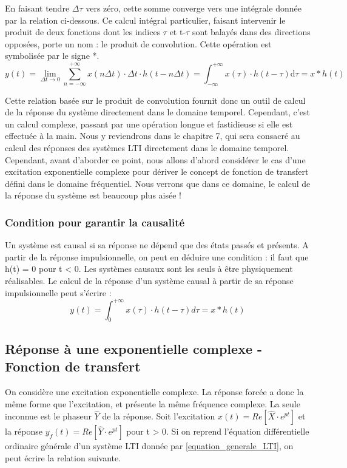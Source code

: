 \documentclass[]{report}
\newcommand{\deriv}{\mathrm{d}}
\begin{document}
	En faisant tendre $ \Delta \tau $ vers zéro, cette somme converge vers une intégrale
	donnée par la relation ci-dessous. Ce calcul intégral particulier,
	faisant intervenir le produit de deux fonctions dont les indices $\tau $ et
	t-$\tau $ sont balayés dans des directions opposées, porte un nom : le produit
	de convolution. Cette opération est symbolisée par le signe *.
	\begin{equation}\label{Demo_produit_convolution}
	y(t) = \lim_{\Delta t \to 0} \sum_{n=-\infty}^{+\infty} x(n\Delta t) \cdot \Delta t \cdot h(t-n\Delta t) = \int_{-\infty}^{+\infty} x(\tau) \cdot h(t-\tau) \deriv \tau = x*h(t)
	\end{equation}
	
	Cette relation basée sur le produit de convolution fournit donc un outil de calcul de la réponse du système directement dans le domaine temporel. Cependant, c'est un calcul complexe, passant par une opération longue et fastidieuse si elle est effectuée à la main. Nous y reviendrons dans le chapitre 7, qui sera consacré au calcul des réponses des systèmes LTI directement dans le domaine temporel. Cependant, avant d'aborder ce point, nous allons d'abord considérer le cas d'une excitation exponentielle complexe pour dériver le concept de fonction de transfert défini dans le domaine fréquentiel. Nous verrons que dans ce domaine, le calcul de la réponse du système est beaucoup plus aisée !
	
	\subsubsection{Condition pour garantir la causalité}
	Un système est causal si sa réponse ne dépend que des états passés et présents. A partir de la réponse impulsionnelle, on peut en déduire une condition : il faut que h(t) = 0 pour t < 0. Les systèmes causaux sont les seuls à être physiquement réalisables. Le calcul de la réponse d'un système causal à partir de sa réponse impulsionnelle peut s'écrire :
	\begin{equation}\label{}
	y(t) = \int_{0}^{+ \infty} x(\tau) \cdot h(t-\tau)d\tau = x*h(t)
	\end{equation}
	\vspace{1\baselineskip}	
	
	
	\subsection{Réponse à une exponentielle complexe - Fonction de transfert}
	On considère une excitation exponentielle complexe. La réponse forcée a donc la même forme que l'excitation, et présente la même fréquence complexe. La seule inconnue est le phaseur $\hat{Y}$ de la réponse. Soit l'excitation $ x(t) = Re[\hat{X} \cdot e^{pt}]$ et la réponse $ y_{f}(t) = Re[\hat{Y} \cdot e^{pt}]$ pour t > 0. Si on reprend l'équation différentielle ordinaire générale d'un système LTI donnée par \ref{equation_generale_LTI}, on peut écrire la relation suivante.
	
\end{document}
